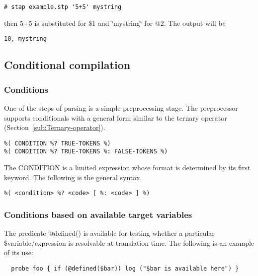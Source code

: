 \documentclass[twoside,english]{article}
\newenvironment{vindent}
{\begin{list}{}{\setlength{\listparindent}{6pt}}
\item[]}
{\end{list}}
\begin{document}
\begin{vindent}
\begin{verbatim}
# stap example.stp '5+5' mystring
\end{verbatim}
\end{vindent}
then 5+5 is substituted for \$1 and \char`\"{}mystring\char`\"{} for @2. The
output will be

\begin{vindent}
\begin{verbatim}
10, mystring
\end{verbatim}
\end{vindent}


\subsection{Conditional compilation}


\subsubsection{Conditions}
One of the steps of parsing is a simple preprocessing stage.  The
preprocessor supports conditionals with a general form similar to the
ternary operator (Section~\ref{sub:Ternary-operator}).

\begin{vindent}
\begin{verbatim}
%( CONDITION %? TRUE-TOKENS %)
%( CONDITION %? TRUE-TOKENS %: FALSE-TOKENS %)
\end{verbatim}
\end{vindent}
The CONDITION is a limited expression whose format is determined by its first
keyword. The following is the general syntax.

\begin{vindent}
\begin{verbatim}
%( <condition> %? <code> [ %: <code> ] %)
\end{verbatim}
\end{vindent}

\subsubsection{Conditions based on available target variables}
The predicate @defined() is available for testing whether a
particular \$variable/expression is resolvable at translation time. The
following is an example of its use:

\begin{vindent}
\begin{verbatim}
  probe foo { if (@defined($bar)) log ("$bar is available here") }
\end{verbatim}
\end{vindent}
\end{document}
